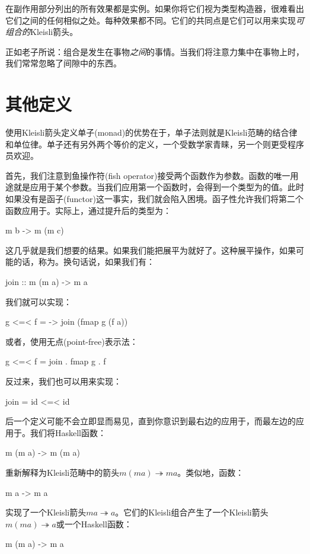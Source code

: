 \documentclass[DaoFP]{subfiles}
\begin{document}
在副作用部分列出的所有效果都是实例。如果你将它们视为类型构造器，很难看出它们之间的任何相似之处。每种效果都不同。它们的共同点是它们可以用来实现\emph{可组合的}Kleisli箭头。

正如老子所说：组合是发生在事物\emph{之间}的事情。当我们将注意力集中在事物上时，我们常常忽略了间隙中的东西。

\section{其他定义}

使用Kleisli箭头定义单子(monad)的优势在于，单子法则就是Kleisli范畴的结合律和单位律。单子还有另外两个等价的定义，一个受数学家青睐，另一个则更受程序员欢迎。

首先，我们注意到鱼操作符(fish operator)接受两个函数作为参数。函数的唯一用途就是应用于某个参数。当我们应用第一个函数时，会得到一个类型为的值。此时如果没有是函子(functor)这一事实，我们就会陷入困境。函子性允许我们将第二个函数应用于。实际上，通过提升后的类型为：
\begin{haskell}
m b -> m (m c)
\end{haskell}
这几乎就是我们想要的结果。如果我们能把展平为就好了。这种展平操作，如果可能的话，称为。换句话说，如果我们有：
\begin{haskell}
join ::  m (m a) -> m a
\end{haskell}
我们就可以实现\hask{<=<}：
\begin{haskell}
g <=< f = \a -> join (fmap g (f a))
\end{haskell}
或者，使用无点(point-free)表示法：
\begin{haskell}
g <=< f = join . fmap g . f
\end{haskell}

反过来，我们也可以用\hask{<=<}来实现：
\begin{haskell}
join = id <=< id
\end{haskell}
后一个定义可能不会立即显而易见，直到你意识到最右边的应用于，而最左边的应用于。我们将Haskell函数：
\begin{haskell}
m (m a) -> m (m a)
\end{haskell}
重新解释为Kleisli范畴中的箭头$ m (m a) \twoheadrightarrow m a$。类似地，函数：
\begin{haskell}
m a -> m a
\end{haskell}
实现了一个Kleisli箭头$m a \twoheadrightarrow a$。它们的Kleisli组合产生了一个Kleisli箭头$m (m a) \twoheadrightarrow a$或一个Haskell函数：
\begin{haskell}
m (m a) -> m a
\end{haskell}
\end{document}
